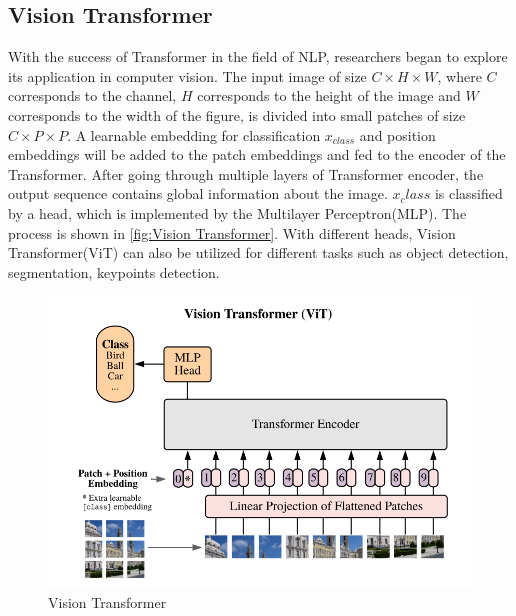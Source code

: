 \subsection{Vision Transformer}
  With the success of Transformer in the field of NLP, researchers began to explore its application in computer vision. The input image of size $C\times H\times W$, where 
  $C$ corresponds to the channel, $H$ corresponds to the height of the image and $W$ corresponds to the width of the figure, is divided into small patches of size$C\times P \times P$.
  A learnable embedding for classification $x_{class}$ and position embeddings will be added to the patch embeddings and fed to the encoder of the Transformer. After going through
  multiple layers of Transformer encoder, the output sequence contains global information about the image. $x_class$ is classified by a head, which is implemented by the 
  Multilayer Perceptron(MLP). The process is shown in \autoref{fig:Vision Transformer}. With different heads, Vision Transformer(ViT) can also be utilized for different tasks 
  such as object detection, segmentation, keypoints detection.
  \begin{figure}[!htbp]
    \centering
    \includegraphics[width=0.9\linewidth]{example_figures/VisionTransformer.png}
    \caption{Vision Transformer \cite{dosovitskiy2021an}}
    \label{fig:Vision Transformer}
  \end{figure}
